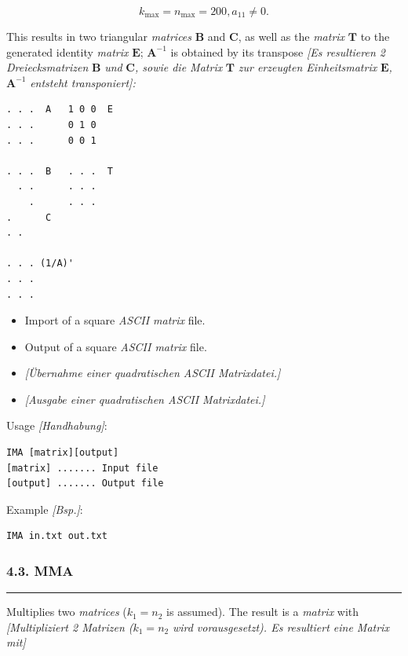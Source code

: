 \documentclass[
]{article}
\begin{document}
\[k_{\max} = n_{\max} = 200,a_{11} \neq 0.\]

This results in two triangular \emph{matrices} \(\mathbf{B}\) and
\(\mathbf{C}\), as well as the \emph{matrix} \(\mathbf{T}\) to the
generated identity \emph{matrix} \(\mathbf{E}\); \(\mathbf{A}^{- 1}\) is
obtained by its transpose \emph{{[}Es resultieren 2 Dreiecksmatrizen}
\(\mathbf{B}\) \emph{und} \(\mathbf{C}\)\emph{, sowie die Matrix}
\(\mathbf{T}\) \emph{zur erzeugten Einheitsmatrix}
\(\mathbf{E}\)\emph{,} \(\mathbf{A}^{- 1}\) \emph{entsteht
transponiert{]}:}

\begin{verbatim}
. . .  A   1 0 0  E
. . .      0 1 0
. . .      0 0 1

. . .  B   . . .  T
  . .      . . .
    .      . . .
.      C
. .

. . . (1/A)'
. . .
. . .
\end{verbatim}

\begin{itemize}
\item
  Import of a square \emph{ASCII matrix} file.
\item
  Output of a square \emph{ASCII matrix} file.
\item
  \emph{{[}Übernahme einer quadratischen ASCII Matrixdatei.{]}}
\item
  \emph{{[}Ausgabe einer quadratischen ASCII Matrixdatei.{]}}
\end{itemize}

Usage \emph{{[}Handhabung{]}}:

\begin{verbatim}
IMA [matrix][output] 
[matrix] ....... Input file 
[output] ....... Output file
\end{verbatim}

Example \emph{{[}Bsp.{]}}:

\begin{verbatim}
IMA in.txt out.txt
\end{verbatim}

\hypertarget{mma}{%
\subsubsection{4.3. MMA}\label{mma}}

\begin{center}\rule{0.5\linewidth}{0.5pt}\end{center}

Multiplies two \emph{matrices} (\(k_{1} = n_{2}\) is assumed). The
result is a \emph{matrix} with \emph{{[}Multipliziert 2 Matrizen
(}\(k_{1} = n_{2}\) \emph{wird vorausgesetzt). Es resultiert eine Matrix
mit{]}}
\end{document}
